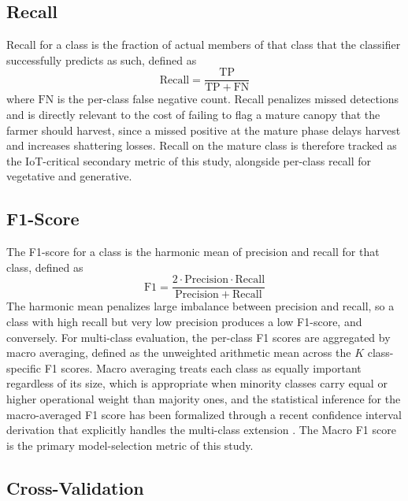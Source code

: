 \subsection{Recall}

Recall for a class is the fraction of actual members of that class that the classifier successfully predicts as such, defined as
\begin{equation}
    \mathrm{Recall} = \frac{\mathrm{TP}}{\mathrm{TP} + \mathrm{FN}}
    \label{eq:recall}
\end{equation}
where $\mathrm{FN}$ is the per-class false negative count. Recall penalizes missed detections and is directly relevant to the cost of failing to flag a mature canopy that the farmer should harvest, since a missed positive at the mature phase delays harvest and increases shattering losses. Recall on the mature class is therefore tracked as the IoT-critical secondary metric of this study, alongside per-class recall for vegetative and generative.

\subsection{F1-Score}

The F1-score for a class is the harmonic mean of precision and recall for that class, defined as
\begin{equation}
    \mathrm{F1} = \frac{2 \cdot \mathrm{Precision} \cdot \mathrm{Recall}}{\mathrm{Precision} + \mathrm{Recall}}
    \label{eq:f1}
\end{equation}
The harmonic mean penalizes large imbalance between precision and recall, so a class with high recall but very low precision produces a low F1-score, and conversely. For multi-class evaluation, the per-class F1 scores are aggregated by macro averaging, defined as the unweighted arithmetic mean across the $K$ class-specific F1 scores. Macro averaging treats each class as equally important regardless of its size, which is appropriate when minority classes carry equal or higher operational weight than majority ones, and the statistical inference for the macro-averaged F1 score has been formalized through a recent confidence interval derivation that explicitly handles the multi-class extension \cite{takahashi2022f1ci}. The Macro F1 score is the primary model-selection metric of this study.

\subsection{Cross-Validation}

